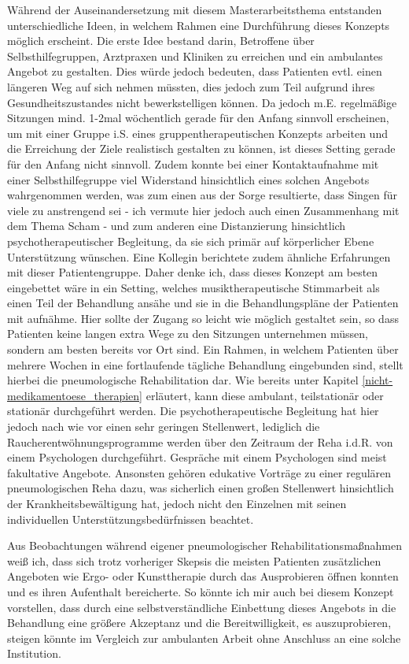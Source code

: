 Während der Auseinandersetzung mit diesem Masterarbeitsthema entstanden unterschiedliche Ideen, in welchem Rahmen eine Durchführung dieses Konzepts möglich erscheint.
Die erste Idee bestand darin, Betroffene über Selbsthilfegruppen, Arztpraxen und Kliniken zu erreichen und ein ambulantes Angebot zu gestalten. Dies würde jedoch bedeuten, dass Patienten evtl. einen längeren Weg auf sich nehmen müssten, dies jedoch zum Teil aufgrund ihres Gesundheitszustandes nicht bewerkstelligen können. Da  jedoch m.E. regelmäßige Sitzungen mind. 1-2mal wöchentlich gerade für den Anfang sinnvoll erscheinen, um mit einer Gruppe i.S. eines gruppentherapeutischen Konzepts arbeiten und die Erreichung der Ziele realistisch gestalten zu können, ist dieses Setting gerade für den Anfang nicht sinnvoll. Zudem konnte bei einer Kontaktaufnahme mit einer Selbsthilfegruppe viel Widerstand hinsichtlich eines solchen Angebots wahrgenommen werden, was zum einen aus der Sorge resultierte, dass Singen für viele zu anstrengend sei - ich vermute hier jedoch auch einen Zusammenhang mit dem Thema Scham - und zum anderen eine Distanzierung hinsichtlich psychotherapeutischer Begleitung, da sie sich primär auf körperlicher Ebene Unterstützung wünschen. Eine Kollegin berichtete zudem ähnliche Erfahrungen mit dieser Patientengruppe. 
Daher denke ich, dass dieses Konzept am besten eingebettet wäre in ein Setting, welches musiktherapeutische Stimmarbeit als einen Teil der Behandlung ansähe und sie in die Behandlungspläne der Patienten mit aufnähme. Hier sollte der Zugang so leicht wie möglich gestaltet sein, so dass Patienten keine langen extra Wege zu den Sitzungen unternehmen müssen, sondern am besten bereits vor Ort sind. Ein Rahmen, in welchem Patienten über mehrere Wochen in eine fortlaufende tägliche Behandlung eingebunden sind, stellt hierbei die pneumologische Rehabilitation dar. Wie bereits unter Kapitel \ref{nicht-medikamentoese_therapien} erläutert, kann diese ambulant, teilstationär oder stationär durchgeführt werden. Die psychotherapeutische Begleitung hat hier jedoch nach wie vor einen sehr geringen Stellenwert, lediglich die Raucherentwöhnungsprogramme werden über den Zeitraum der Reha i.d.R. von einem Psychologen durchgeführt. Gespräche mit einem Psychologen sind meist fakultative Angebote. Ansonsten gehören edukative Vorträge zu einer regulären pneumologischen Reha dazu, was sicherlich einen großen Stellenwert hinsichtlich der Krankheitsbewältigung hat, jedoch nicht den Einzelnen mit seinen individuellen Unterstützungsbedürfnissen beachtet. 

Aus Beobachtungen während eigener pneumologischer Rehabilitationsmaßnahmen weiß ich, dass sich trotz vorheriger Skepsis die meisten Patienten zusätzlichen Angeboten wie Ergo- oder Kunsttherapie durch das Ausprobieren öffnen konnten und es ihren Aufenthalt bereicherte. So könnte ich mir auch bei diesem Konzept vorstellen, dass durch eine selbstverständliche Einbettung dieses Angebots in die Behandlung eine größere Akzeptanz und die Bereitwilligkeit, es auszuprobieren, steigen könnte im Vergleich zur ambulanten Arbeit ohne Anschluss an eine solche Institution. 

